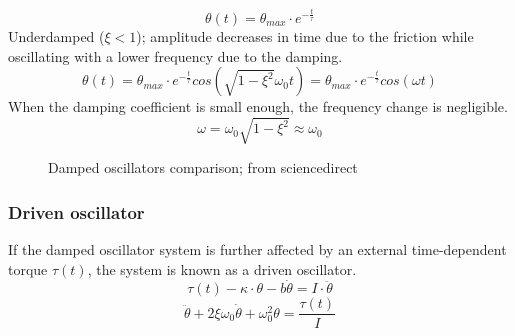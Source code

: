 \documentclass[\main/master.tex]{subfiles}
\begin{document}
\begin{equation}
\theta(t) = \theta_{max}\cdot e^{-\frac{t}{\tau}}     \label{eqn:underdamped_motion_equation}
\end{equation}
Underdamped ($\xi < 1$); amplitude decreases in time due to the friction while oscillating with a lower frequency due to the damping. 
\begin{equation}
\theta(t) = \theta_{max}\cdot e^{-\frac{t}{\tau}}cos(\sqrt{1-\xi^2}\omega_0 t ) =  \theta_{max}\cdot e^{-\frac{t}{\tau}}cos(\omega t )    \label{eqn:underdamped_motion_equation}
\end{equation}
When the damping coefficient is small enough, the frequency change is negligible.
\begin{equation}
\omega = \omega_0\sqrt{1-\xi^2}\approx\omega_0    \label{eqn:underdamped_frequency}
\end{equation}

\begin{figure}[htbp]
	\centering
	\caption[Damped oscillators comparison]{Damped oscillators comparison; from sciencedirect \cite{underdamped-system}}
	\label{fig:damped_oscillators}
\end{figure}





\iffalse
https://ocw.mit.edu/courses/mathematics/18-03sc-differential-equations-fall-2011/unit-ii-second-order-constant-coefficient-linear-equations/damped-harmonic-oscillators/MIT18_03SCF11_s13_2text.pdf

https://www.sciencedirect.com/topics/engineering/underdamped-system#:~:text=When%
\fi

\subsubsection{Driven oscillator}
If the damped oscillator system is further affected by an external time-dependent torque $\tau(t)$, the system is known as a driven oscillator.
\begin{equation}
\tau(t) -\kappa\cdot\theta - b\dot{\theta}  = I\cdot\ddot{\theta}   \label{eqn:driven_motion_equation}
\end{equation} 
\begin{equation}
\ddot{\theta} + 2\xi\omega_0\dot{\theta} + \omega_0^2\theta = \frac{\tau(t)}{I}   \label{eqn:damped_motion_equation}
\end{equation}
\end{document}
